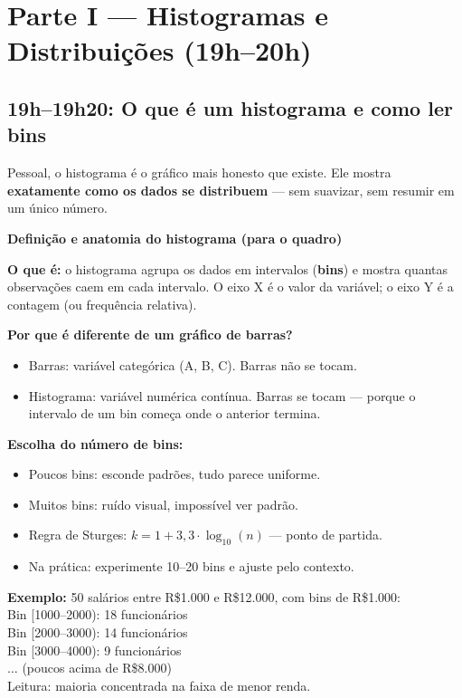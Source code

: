 \section{Parte I — Histogramas e Distribuições (19h–20h)}

\subsection{19h–19h20: O que é um histograma e como ler bins}

Pessoal, o histograma é o gráfico mais honesto que existe. Ele mostra
\textbf{exatamente como os dados se distribuem} — sem suavizar, sem resumir
em um único número.

\begin{BoardBox}
\textbf{Definição e anatomia do histograma (para o quadro)}

\textbf{O que é:} o histograma agrupa os dados em intervalos (\textbf{bins})
e mostra quantas observações caem em cada intervalo. O eixo X é o
valor da variável; o eixo Y é a contagem (ou frequência relativa).

\textbf{Por que é diferente de um gráfico de barras?}
\begin{itemize}
  \item Barras: variável categórica (A, B, C). Barras não se tocam.
  \item Histograma: variável numérica contínua. Barras se tocam — porque
  o intervalo de um bin começa onde o anterior termina.
\end{itemize}

\textbf{Escolha do número de bins:}
\begin{itemize}
  \item Poucos bins: esconde padrões, tudo parece uniforme.
  \item Muitos bins: ruído visual, impossível ver padrão.
  \item Regra de Sturges: $k = 1 + 3{,}3 \cdot \log_{10}(n)$ — ponto de partida.
  \item Na prática: experimente 10–20 bins e ajuste pelo contexto.
\end{itemize}

\textbf{Exemplo:} 50 salários entre R\$1.000 e R\$12.000, com bins de R\$1.000:\\
Bin [1000–2000): 18 funcionários\\
Bin [2000–3000): 14 funcionários\\
Bin [3000–4000): 9 funcionários\\
$\ldots$ (poucos acima de R\$8.000)\\
Leitura: maioria concentrada na faixa de menor renda.
\end{BoardBox}

